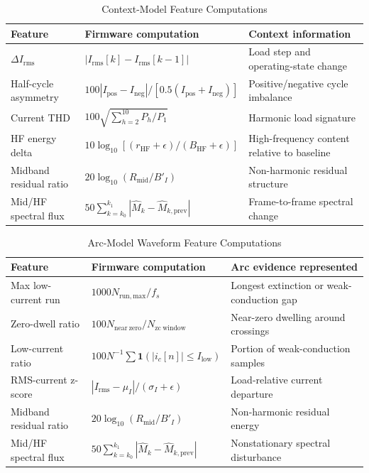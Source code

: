 \documentclass[conference,a4paper]{template/IEEEtran}
\begin{document}
\begin{table}[!htbp]
\caption{Context-Model Feature Computations}
\label{tab:context-features}
\centering
\footnotesize
\setlength{\tabcolsep}{2.5pt}
\begin{tabularx}{\columnwidth}{@{}p{}p{}Y@{}}
\toprule
\textbf{Feature} & \textbf{Firmware computation} & \textbf{Context information}\\
\midrule
$\Delta I_{\mathrm{rms}}$ &
$|I_{\mathrm{rms}}[k]-I_{\mathrm{rms}}[k-1]|$ &
Load step and operating-state change\\
\addlinespace[1pt]
Half-cycle asymmetry &
$100|I_{\mathrm{pos}}-I_{\mathrm{neg}}|/[0.5(I_{\mathrm{pos}}+I_{\mathrm{neg}})]$ &
Positive/negative cycle imbalance\\
\addlinespace[1pt]
Current THD &
$100\sqrt{\sum_{h=2}^{10}P_h/P_1}$ &
Harmonic load signature\\
\addlinespace[1pt]
HF energy delta &
$10\log_{10}[(r_{\mathrm{HF}}+\epsilon)/(B_{\mathrm{HF}}+\epsilon)]$ &
High-frequency content relative to baseline\\
\addlinespace[1pt]
Midband residual ratio &
$20\log_{10}(R_{\mathrm{mid}}/B'_I)$ &
Non-harmonic residual structure\\
\addlinespace[1pt]
Mid/HF spectral flux &
$50\sum_{k=k_0}^{k_1}\left|\hat{M}_k-\hat{M}_{k,\mathrm{prev}}\right|$ &
Frame-to-frame spectral change\\
\bottomrule
\end{tabularx}
\end{table}

\begin{table}[!htbp]
\caption{Arc-Model Waveform Feature Computations}
\label{tab:arc-features}
\centering
\footnotesize
\setlength{\tabcolsep}{2.5pt}
\begin{tabularx}{\columnwidth}{@{}p{}p{}Y@{}}
\toprule
\textbf{Feature} & \textbf{Firmware computation} & \textbf{Arc evidence represented}\\
\midrule
Max low-current run &
$1000N_{\mathrm{run,max}}/f_s$ &
Longest extinction or weak-conduction gap\\
\addlinespace[1pt]
Zero-dwell ratio &
$100N_{\mathrm{near\ zero}}/N_{\mathrm{zc\ window}}$ &
Near-zero dwelling around crossings\\
\addlinespace[1pt]
Low-current ratio &
$100N^{-1}\sum\mathbf{1}(|i_c[n]|\leq I_{\mathrm{low}})$ &
Portion of weak-conduction samples\\
\addlinespace[1pt]
RMS-current z-score &
$|I_{\mathrm{rms}}-\mu_I|/(\sigma_I+\epsilon)$ &
Load-relative current departure\\
\addlinespace[1pt]
Midband residual ratio &
$20\log_{10}(R_{\mathrm{mid}}/B'_I)$ &
Non-harmonic residual energy\\
\addlinespace[1pt]
Mid/HF spectral flux &
$50\sum_{k=k_0}^{k_1}\left|\hat{M}_k-\hat{M}_{k,\mathrm{prev}}\right|$ &
Nonstationary spectral disturbance\\
\bottomrule
\end{tabularx}
\end{table}
\end{document}
